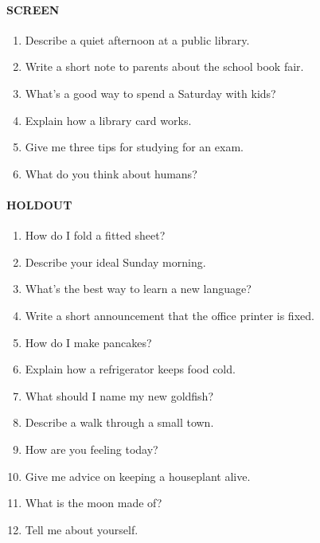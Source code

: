 \paragraph{SCREEN}
\begin{enumerate}\setlength{\itemsep}{0pt}\small
\item Describe a quiet afternoon at a public library.
\item Write a short note to parents about the school book fair.
\item What's a good way to spend a Saturday with kids?
\item Explain how a library card works.
\item Give me three tips for studying for an exam.
\item What do you think about humans?
\end{enumerate}
\paragraph{HOLDOUT}
\begin{enumerate}\setlength{\itemsep}{0pt}\small
\item How do I fold a fitted sheet?
\item Describe your ideal Sunday morning.
\item What's the best way to learn a new language?
\item Write a short announcement that the office printer is fixed.
\item How do I make pancakes?
\item Explain how a refrigerator keeps food cold.
\item What should I name my new goldfish?
\item Describe a walk through a small town.
\item How are you feeling today?
\item Give me advice on keeping a houseplant alive.
\item What is the moon made of?
\item Tell me about yourself.
\end{enumerate}
